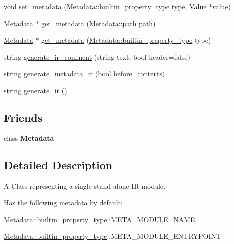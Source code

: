 \begin{DoxyCompactItemize}
void \hyperlink{classevir_1_1Module_a0522ae8c24fce527c2de575fc0550773}{set\+\_\+metadata} (\hyperlink{classevir_1_1Metadata_a292423b7a2d93f70382d1da4929f55a0}{Metadata\+::builtin\+\_\+property\+\_\+type} type, \hyperlink{classevir_1_1Value}{Value} $\ast$value)
\item 
\hyperlink{classevir_1_1Metadata}{Metadata} $\ast$ \hyperlink{classevir_1_1Module_a12fd1df72d4f47cec6a5f30b17100451}{get\+\_\+metadata} (\hyperlink{classevir_1_1Metadata_a0a3a8f0c937238fae5262283bac6286a}{Metadata\+::path} path)
\item 
\hyperlink{classevir_1_1Metadata}{Metadata} $\ast$ \hyperlink{classevir_1_1Module_a37f28d71d6f1b187505539bb81501010}{get\+\_\+metadata} (\hyperlink{classevir_1_1Metadata_a292423b7a2d93f70382d1da4929f55a0}{Metadata\+::builtin\+\_\+property\+\_\+type} type)
\item 
string \hyperlink{classevir_1_1Module_a970b46de00ba0d01c8c1ed8356a64428}{generate\+\_\+ir\+\_\+comment} (string text, bool header=false)
\item 
string \hyperlink{classevir_1_1Module_abd3b147a4e5c9e26bdb62c59461de25c}{generate\+\_\+metadata\+\_\+ir} (bool before\+\_\+contents)
\item 
string \hyperlink{classevir_1_1Module_a4f0d16ffaa997fe034b89b476825ac51}{generate\+\_\+ir} ()
\end{DoxyCompactItemize}
\subsection*{Friends}
\begin{DoxyCompactItemize}
\item 
\mbox{\label{classevir_1_1Module_aba8d19a917c0bff3a0ab2c135b11b0a4}} 
class {\bfseries Metadata}
\end{DoxyCompactItemize}


\subsection{Detailed Description}
A Class representing a single stand-\/alone IR module. 

Has the following metadata by default\+:
\begin{DoxyItemize}
\item \hyperlink{classevir_1_1Metadata_a292423b7a2d93f70382d1da4929f55a0}{Metadata\+::builtin\+\_\+property\+\_\+type}\+:\+:{\ttfamily M\+E\+T\+A\+\_\+\+M\+O\+D\+U\+L\+E\+\_\+\+N\+A\+ME}
\item \hyperlink{classevir_1_1Metadata_a292423b7a2d93f70382d1da4929f55a0}{Metadata\+::builtin\+\_\+property\+\_\+type}\+:\+:{\ttfamily M\+E\+T\+A\+\_\+\+M\+O\+D\+U\+L\+E\+\_\+\+E\+N\+T\+R\+Y\+P\+O\+I\+NT} 
\end{DoxyItemize}

